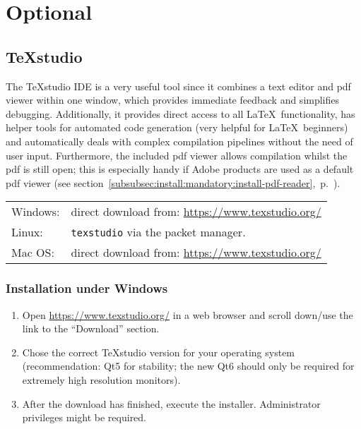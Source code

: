		\newpage
		\section{Optional}
			\subsection{TeXstudio}
				\label{installation:optional:texstudio}
				The TeXstudio IDE is a very useful tool since it combines a text editor and pdf viewer within one window, which provides immediate feedback and simplifies debugging. Additionally, it provides direct access to all \LaTeX~functionality, has helper tools for automated code generation (very helpful for \LaTeX~beginners) and automatically deals with complex compilation pipelines without the need of user input.  Furthermore, the included pdf viewer allows compilation whilst the pdf is still open; this is especially handy if Adobe products are used as a default pdf viewer (see \mbox{section \ref{subsubsec:install:mandatory:install-pdf-reader}, p. \pageref{subsubsec:install:mandatory:install-pdf-reader}}).
				\newline 
				\begin{longtable}[c]{ll}
					\rowcolor{white}
					\multicolumn{2}{l}{\textbf{Recommendation:}}\\
					\midrule
					\endfirsthead
					Windows: & direct download from: \href{https://www.texstudio.org/}{https://www.texstudio.org/}\\
					Linux: & \lstinline$texstudio$ via the packet manager. \\
					Mac OS: & direct download from: \href{https://www.texstudio.org/}{https://www.texstudio.org/}\\
					\midrule
				\end{longtable}
				
			\subsubsection{Installation under Windows}
				\begin{enumerate}[label={\color{docartTurquoise}Step \arabic*:},leftmargin=*]
					\setlength\itemsep{-0.2em}
					\item Open \href{https://www.texstudio.org/}{https://www.texstudio.org/} in a web browser and scroll down/use the link to the \enquote{Download} section.
					\item Chose the correct TeXstudio version for your operating system (recommendation: Qt5 for stability; the new Qt6 should only be required for extremely high resolution monitors).
					\item After the download has finished, execute the installer. Administrator privileges might be required.
				\end{enumerate}
				
